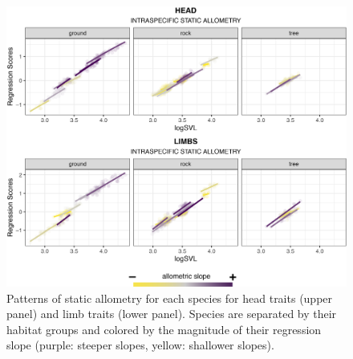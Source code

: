 \documentclass[
  11pt,
]{article}
\begin{document}
\begin{figure}

{\centering \includegraphics[width=1\linewidth]{Figs/figure_4_static_allometry_v3} 

}

\caption{Patterns of static allometry for each species for head traits (upper panel) and limb traits (lower panel). Species are separated by their habitat groups and colored by the magnitude of their regression slope (purple: steeper slopes, yellow: shallower slopes).}\label{fig:unnamed-chunk-7}
\end{figure}

\newpage
\end{document}
